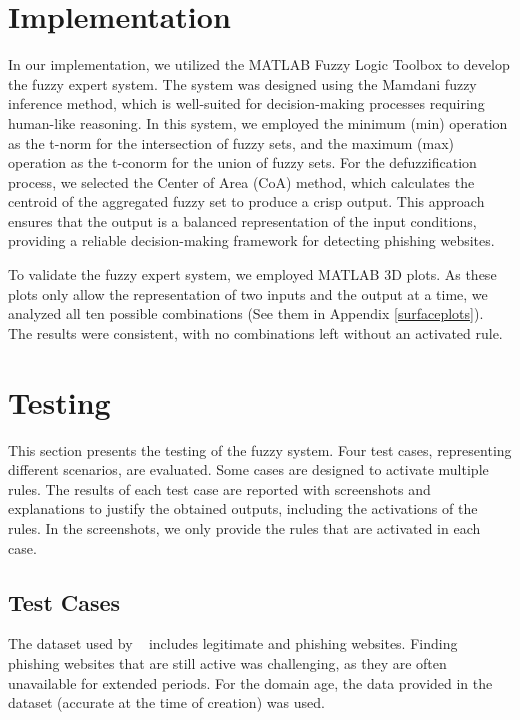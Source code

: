 \documentclass[11pt]{article}
\begin{document}
\section{Implementation}

In our implementation, we utilized the MATLAB Fuzzy Logic Toolbox to develop the fuzzy expert system. The system was designed using the Mamdani fuzzy inference method, which is well-suited for decision-making processes requiring human-like reasoning. In this system, we employed the minimum (min) operation as the t-norm for the intersection of fuzzy sets, and the maximum (max) operation as the t-conorm for the union of fuzzy sets. For the defuzzification process, we selected the Center of Area (CoA) method, which calculates the centroid of the aggregated fuzzy set to produce a crisp output. This approach ensures that the output is a balanced representation of the input conditions, providing a reliable decision-making framework for detecting phishing websites.

To validate the fuzzy expert system, we employed MATLAB 3D plots. As these plots only allow the representation of two inputs and the output at a time, we analyzed all ten possible combinations (See them in Appendix \ref{surfaceplots}). The results were consistent, with no combinations left without an activated rule.


\section{Testing}

This section presents the testing of the fuzzy system. Four test cases, representing different scenarios, are evaluated. Some cases are designed to activate multiple rules. The results of each test case are reported with screenshots and explanations to justify the obtained outputs, including the activations of the rules. In the screenshots, we only provide the rules that are activated in each case.

\subsection{Test Cases}

The dataset used by ~\cite{mainpaper} includes legitimate and phishing websites. Finding phishing websites that are still active was challenging, as they are often unavailable for extended periods. For the domain age, the data provided in the dataset (accurate at the time of creation) was used.
\end{document}
